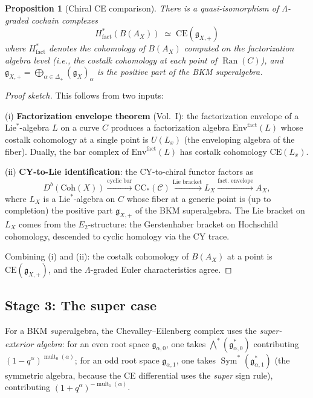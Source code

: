 \documentclass[11pt]{article}
\newtheorem{proposition}[theorem]{Proposition}
\theoremstyle{definition}
\theoremstyle{remark}
\DeclareMathOperator{\Ran}{Ran}
\DeclareMathOperator{\Sym}{Sym}
\DeclareMathOperator{\mult}{mult}
\newcommand{\frakg}{\mathfrak{g}}
\newcommand{\cC}{\mathcal{C}}
\begin{document}
\begin{proposition}[Chiral CE comparison]
\label{prop:chiral-ce}
There is a quasi-isomorphism of $\Lambda$-graded cochain complexes
\begin{equation}
\label{eq:chiral-ce}
 H^*_{\mathrm{fact}}(B(A_X))
 \;\simeq\;
 \mathrm{CE}(\frakg_{X,+})
\end{equation}
where $H^*_{\mathrm{fact}}$ denotes the cohomology of $B(A_X)$ computed
on the factorization algebra level (i.e., the costalk cohomology at each
point of $\Ran(C)$), and $\frakg_{X,+} = \bigoplus_{\alpha \in \Delta_+}
(\frakg_X)_\alpha$ is the positive part of the BKM superalgebra.
\end{proposition}

\begin{proof}[Proof sketch]
This follows from two inputs:

(i) \textbf{Factorization envelope theorem} (Vol.~I): the factorization
envelope of a Lie${}^*$-algebra $L$ on a curve $C$ produces a factorization
algebra $\mathrm{Env}^{\mathrm{fact}}(L)$ whose costalk cohomology at
a single point is $U(L_x)$ (the enveloping algebra of the fiber).
Dually, the bar complex of $\mathrm{Env}^{\mathrm{fact}}(L)$ has
costalk cohomology $\mathrm{CE}(L_x)$.

(ii) \textbf{CY-to-Lie identification}: the CY-to-chiral functor factors
as
\[
 D^b(\mathrm{Coh}(X))
 \xrightarrow{\text{cyclic bar}}
 \mathrm{CC}_*(\cC)
 \xrightarrow{\text{Lie bracket}}
 L_X
 \xrightarrow{\text{fact.\ envelope}}
 A_X,
\]
where $L_X$ is a Lie${}^*$-algebra on $C$ whose fiber at a generic point
is (up to completion) the positive part $\frakg_{X,+}$ of the BKM
superalgebra. The Lie bracket on $L_X$ comes from the $E_2$-structure:
the Gerstenhaber bracket on Hochschild cohomology, descended to cyclic
homology via the CY trace.

Combining (i) and (ii): the costalk cohomology of $B(A_X)$ at a point
is $\mathrm{CE}(\frakg_{X,+})$, and the $\Lambda$-graded Euler
characteristics agree.
\end{proof}

\subsection{Stage 3: The super case}

For a BKM \emph{super}algebra, the Chevalley--Eilenberg complex uses the
\emph{super-exterior algebra}: for an even root space $\frakg_{\alpha,0}$,
one takes $\bigwedge^*(\frakg_{\alpha,0}^*)$ contributing
$(1-q^\alpha)^{\mult_0(\alpha)}$; for an odd root space
$\frakg_{\alpha,1}$, one takes $\Sym^*(\frakg_{\alpha,1}^*)$ (the symmetric
algebra, because the CE differential uses the \emph{super} sign rule),
contributing $(1+q^\alpha)^{-\mult_1(\alpha)}$.
\end{document}
